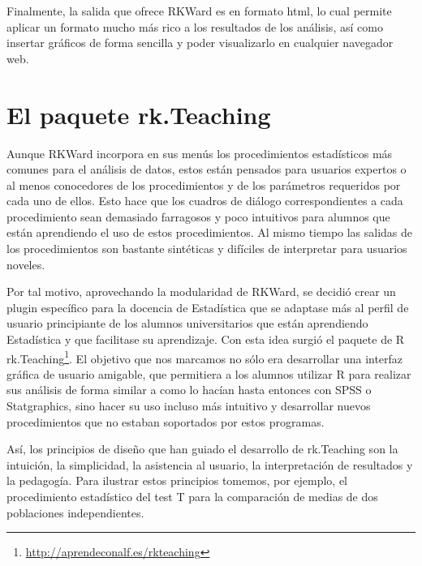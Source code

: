 \documentclass[a4paper,10pt,twoside]{article}
\newcommand{\rkteaching}{\textsf{rk.Teaching}}
\newcommand{\rkward}{\textsf{RKWard}}
\newcommand{\spss}{\textsf{SPSS}}
\newcommand{\statgraphics}{\textsf{Statgraphics}}
\begin{document}
Finalmente, la salida que ofrece \rkward{} es en formato html, lo cual permite aplicar un formato mucho más rico a los
resultados de los análisis, así como insertar gráficos de forma sencilla y poder visualizarlo en cualquier navegador web.
 

\section{El paquete \rkteaching}
\label{s:rkteaching}
Aunque \rkward{} incorpora en sus menús los procedimientos estadísticos más comunes para el análisis de datos, estos
están pensados para usuarios expertos o al menos conocedores de los procedimientos y de los parámetros requeridos por
cada uno de ellos. 
Esto hace que los cuadros de diálogo correspondientes a cada procedimiento sean demasiado farragosos y poco intuitivos
para alumnos que están aprendiendo el uso de estos procedimientos.
Al mismo tiempo las salidas de los procedimientos son bastante sintéticas y difíciles de interpretar para usuarios
noveles. 

Por tal motivo, aprovechando la modularidad de \rkward, se decidió crear un plugin específico para la docencia de
Estadística que se adaptase más al perfil de usuario principiante de los alumnos universitarios que están aprendiendo
Estadística y que facilitase su aprendizaje. 
Con esta idea surgió el paquete de R \rkteaching\footnote{\url{http://aprendeconalf.es/rkteaching}}.
El objetivo que nos marcamos no sólo era desarrollar una interfaz gráfica de usuario amigable, que permitiera a los
alumnos utilizar R para realizar sus análisis de forma similar a como lo hacían hasta entonces con \spss{} o \statgraphics{},
sino hacer su uso incluso más intuitivo y desarrollar nuevos procedimientos que no estaban soportados por estos
programas. 

Así, los principios de diseño que han guiado el desarrollo de \rkteaching{} son la intuición, la simplicidad, la
asistencia al usuario, la interpretación de resultados y la pedagogía.  
Para ilustrar estos principios tomemos, por ejemplo, el procedimiento estadístico del test T para la comparación de
medias de dos poblaciones independientes.
\end{document}
